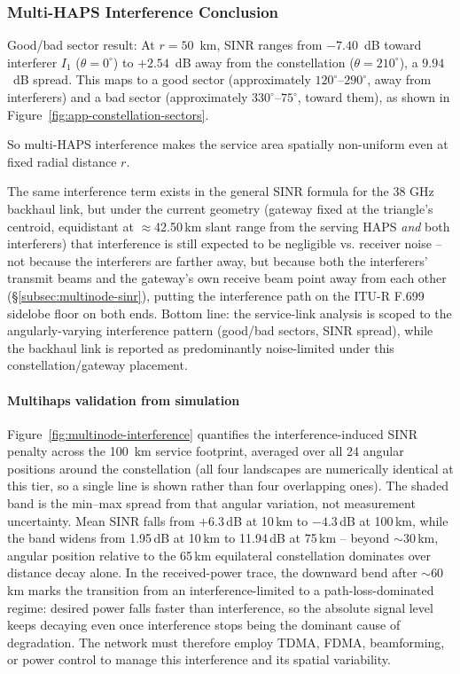 \documentclass[conference]{IEEEtran}
\begin{document}
\subsubsection{Multi-HAPS Interference Conclusion}

Good/bad sector result: At $r = 50$~km, SINR ranges from
$-7.40$~dB toward interferer $I_1$ ($\theta = 0^\circ$) to
$+2.54$~dB away from the constellation ($\theta = 210^\circ$),
a $9.94$~dB spread. This maps to a good sector
(approximately $120^\circ$--$290^\circ$, away from interferers) and
a bad sector (approximately $330^\circ$--$75^\circ$, toward them),
as shown in Figure~\ref{fig:app-constellation-sectors}.

So multi-HAPS interference makes the service area spatially non-uniform even at fixed radial distance $r$.

The same interference term exists in the general SINR formula for the 38 GHz backhaul link, but under the current geometry (gateway fixed at the triangle's centroid, equidistant at $\approx$42.50\,km slant range from the serving HAPS \emph{and} both interferers) that interference is still expected to be negligible vs. receiver noise -- not because the interferers are farther away, but because both the interferers' transmit beams and the gateway's own receive beam point away from each other (\S\ref{subsec:multinode-sinr}), putting the interference path on the ITU-R F.699 sidelobe floor on both ends.
Bottom line: the service-link analysis is scoped to the angularly-varying interference pattern (good/bad sectors, SINR spread), while the backhaul link is reported as predominantly noise-limited under this constellation/gateway placement.



\paragraph{Multihaps validation from simulation}

Figure~\ref{fig:multinode-interference} quantifies the interference-induced SINR penalty across the 100~km service footprint, averaged over all 24 angular positions around the constellation (all four landscapes are numerically identical at this tier, so a single line is shown rather than four overlapping ones). The shaded band is the min--max spread from that angular variation, not measurement uncertainty. Mean SINR falls from $+6.3$\,dB at 10\,km to $-4.3$\,dB at 100\,km, while the band widens from 1.95\,dB at 10\,km to 11.94\,dB at 75\,km -- beyond $\sim$30\,km, angular position relative to the 65\,km equilateral constellation dominates over distance decay alone. In the received-power trace, the downward bend after $\sim$60\,km marks the transition from an interference-limited to a path-loss-dominated regime: desired power falls faster than interference, so the absolute signal level keeps decaying even once interference stops being the dominant cause of degradation. The network must therefore employ TDMA, FDMA, beamforming, or power control to manage this interference and its spatial variability.
\end{document}
